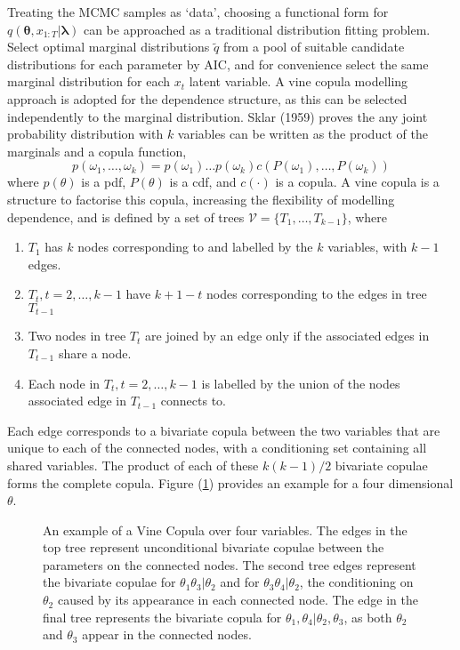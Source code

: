 \documentclass[12pt,a4paper]{article}%
\numberwithin{equation}{section}
\begin{document}
Treating the MCMC samples as `data', choosing a functional form for $q(\boldsymbol{\theta}, x_{1:T} | \boldsymbol{\lambda})$ can be approached as a traditional distribution fitting problem. Select optimal marginal distributions $\tilde{q}$ from a pool of suitable candidate distributions for each parameter by AIC, and for convenience select the same marginal distribution for each $x_t$ latent variable. A vine copula modelling approach is adopted for the dependence structure, as this can be selected independently to the marginal distribution. Sklar (1959) proves the any joint probability distribution with $k$ variables can be written as the product of the marginals and a copula function,
\begin{equation}
\label{vc1}
p(\omega_1, \dots, \omega_k) = p(\omega_1) \dots p(\omega_k) c(P(\omega_1), \dots, P(\omega_k))
\end{equation}
where $p(\theta)$ is a pdf, $P(\theta)$ is a cdf, and $c(\cdot)$ is a copula. A vine copula is a structure to factorise this copula, increasing the flexibility of modelling dependence, and is defined by a set of trees $\mathcal{V} = \{T_1, \dots, T_{k-1} \}$, where
\begin{enumerate}
\item $T_1$ has $k$ nodes corresponding to and labelled by the $k$ variables, with $k-1$ edges.
\item $T_t, t = 2, \dots, k-1$ have $k+1-t$ nodes corresponding to the edges in tree $T_{t-1}$
\item Two nodes in tree $T_t$ are joined by an edge only if the associated edges in $T_{t-1}$ share a node. 
\item Each node in $T_t,  t = 2, \dots, k-1$ is labelled by the union of the nodes associated edge in $T_{t-1}$ connects to.
\end{enumerate}
Each edge corresponds to a bivariate copula between the two variables that are unique to each of the connected nodes, with a conditioning set containing all shared variables. The product of each of these $k(k-1)/2$ bivariate copulae forms the complete copula. Figure (\ref{fig:vinecop}) provides an example for a four dimensional $\theta$.
\begin{figure}[h]
\centering
\vspace{2mm}
\caption{An example of a Vine Copula over four variables. The edges in the top tree represent unconditional bivariate copulae between the parameters on the connected nodes. The second tree edges represent the bivariate copulae for $\theta_1 \theta_3 | \theta_2$ and for $\theta_3 \theta_4 | \theta_2$, the conditioning on $\theta_2$ caused by its appearance in each connected node. The edge in the final tree represents the bivariate copula for $\theta_1, \theta_4 | \theta_2, \theta_3$, as both $\theta_2$ and $\theta_3$ appear in the connected nodes.}
\label{fig:vinecop}
\end{figure}
\end{document}
